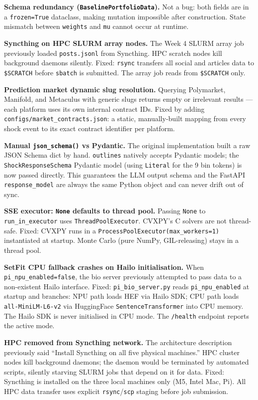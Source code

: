 \documentclass[11pt]{article}
\begin{document}
\textbf{Schema redundancy (\texttt{BaselinePortfolioData}).} Not a bug: both fields
are in a \texttt{frozen=True} dataclass, making mutation impossible after construction.
State mismatch between \texttt{weights} and \texttt{mu} cannot occur at runtime.

\textbf{Syncthing on HPC SLURM array nodes.} The Week 4 SLURM array job previously
loaded \texttt{posts.jsonl} from Syncthing. HPC scratch nodes kill background daemons
silently. Fixed: \texttt{rsync} transfers all social and articles data to
\texttt{\$SCRATCH} before \texttt{sbatch} is submitted. The array job reads from
\texttt{\$SCRATCH} only.

\textbf{Prediction market dynamic slug resolution.} Querying Polymarket, Manifold,
and Metaculus with generic slugs returns empty or irrelevant results --- each platform
uses its own internal contract IDs. Fixed by adding
\texttt{configs/market\_contracts.json}: a static, manually-built mapping from
every shock event to its exact contract identifier per platform.

\textbf{Manual \texttt{json\_schema()} vs Pydantic.} The original implementation
built a raw JSON Schema dict by hand. \texttt{outlines} natively accepts Pydantic
models; the \texttt{ShockResponseSchema} Pydantic model (using \texttt{Literal} for
the 9 bin tokens) is now passed directly. This guarantees the LLM output schema and
the FastAPI \texttt{response\_model} are always the same Python object and can never
drift out of sync.

\textbf{SSE executor: \texttt{None} defaults to thread pool.} Passing \texttt{None}
to \texttt{run\_in\_executor} uses \texttt{ThreadPoolExecutor}. CVXPY's C solvers
are not thread-safe. Fixed: CVXPY runs in a \texttt{ProcessPoolExecutor(max\_workers=1)}
instantiated at startup. Monte Carlo (pure NumPy, GIL-releasing) stays in a thread pool.

\textbf{SetFit CPU fallback crashes on Hailo initialisation.} When
\texttt{pi\_npu\_enabled=false}, the bio server previously attempted to pass data
to a non-existent Hailo interface. Fixed: \texttt{pi\_bio\_server.py} reads
\texttt{pi\_npu\_enabled} at startup and branches: NPU path loads HEF via Hailo SDK;
CPU path loads \texttt{all-MiniLM-L6-v2} via HuggingFace \texttt{SentenceTransformer}
into CPU memory. The Hailo SDK is never initialised in CPU mode. The \texttt{/health}
endpoint reports the active mode.

\textbf{HPC removed from Syncthing network.} The architecture description previously
said ``Install Syncthing on all five physical machines.'' HPC cluster nodes kill
background daemons; the daemon would be terminated by automated scripts, silently
starving SLURM jobs that depend on it for data. Fixed: Syncthing is installed on
the three local machines only (M5, Intel Mac, Pi). All HPC data transfer
uses explicit \texttt{rsync}/\texttt{scp} staging before job submission.
\end{document}
